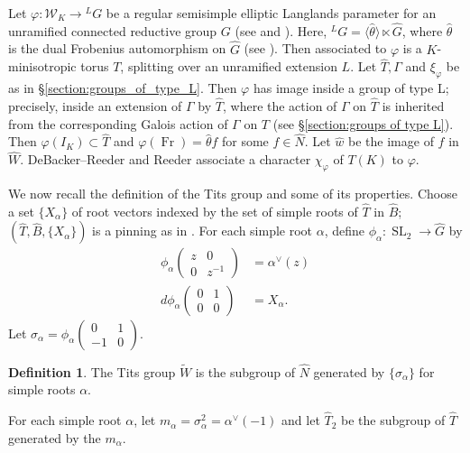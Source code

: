 \documentclass{compositio}
\theoremstyle{plain}
\theoremstyle{definition}
\newtheorem{definition}[theorem]{Definition}
\DeclareMathOperator{\Fr}{Fr}
\DeclareMathOperator{\SL}{SL}
\newcommand{\Weil}{\mathcal{W}}
\begin{document}
Let $\varphi : \Weil_K \rightarrow {}^L G$ be a regular semisimple elliptic Langlands
parameter for an unramified connected reductive group $G$
(see \cite{reeder-debacker:09a} and \cite{reeder:08a}).
Here, ${}^L G = \langle \hat{\theta} \rangle \ltimes \hat{G}$,
where $\hat{\theta}$ is the dual Frobenius automorphism on $\hat{G}$
(see \cite[\S 3]{reeder-debacker:09a}).
Then associated to $\varphi$ is a $K$-minisotropic torus $T$, splitting over an unramified extension $L$. 
Let $\hat{T}, \Gamma$ and $\xi_{\varphi}$ be as in
\S\ref{section:groups_of_type_L}. Then $\varphi$ has image inside a group of type L; precisely, inside an
extension of $\Gamma$ by $\hat{T}$, where the action of $\Gamma$ on $\hat{T}$ is inherited from the corresponding
Galois action of $\Gamma$ on $T$ (see \S\ref{section:groups of type L}).
Then $\varphi(I_K) \subset \hat{T}$ and
$\varphi(\Fr) = \hat{\theta} f$ for some $f \in \hat{N}$.  Let $\hat{w}$
be the image of $f$ in $\hat{W}$.
DeBacker--Reeder \cite{reeder-debacker:09a} and Reeder \cite{reeder:08a}
associate a character $\chi_{\varphi}$ of $T(K)$ to $\varphi$.

We now recall the definition of
the Tits group and some of its properties.  Choose a set $\{ X_{\alpha} \}$ of root vectors
indexed by the set of simple roots of $\hat{T}$ in $\hat{B}$; $(\hat{T}, \hat{B}, \{X_{\alpha} \})$
is a pinning as in \cite[\S 3.1]{reeder:09a}.
For each simple root $\alpha$, define $\phi_{\alpha} : \SL_2 \rightarrow \hat{G}$
by
\begin{align*}
\phi_{\alpha}\begin{pmatrix}z & 0 \\ 0 & z^{-1}\end{pmatrix} &= \alpha^{\vee}(z) \\
d \phi_{\alpha}\begin{pmatrix}0 & 1 \\ 0 & 0\end{pmatrix} &= X_{\alpha}.
\end{align*}
Let $\sigma_{\alpha} = \phi_{\alpha}\begin{pmatrix}0 & 1 \\ -1 & 0\end{pmatrix}$.

\begin{definition}
  The Tits group $\widetilde{W}$ is the subgroup of $\hat{N}$
  generated by $\{\sigma_{\alpha} \}$ for simple roots $\alpha$.
\end{definition}

For each simple root $\alpha$, let $m_{\alpha} = \sigma_{\alpha}^2 = \alpha^{\vee}(-1)$ and
let $\hat{T}_2$ be the subgroup of $\hat{T}$ generated by the $m_{\alpha}$.
\end{document}
